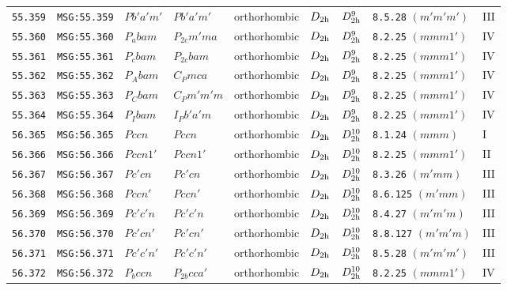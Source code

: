 \documentclass[fleqn,10pt]{jsarticle}
\begin{document}
\begin{center}
\begin{longtable}{lllllllll}
\texttt{55.359} & \texttt{MSG:55.359} & $Pb'a'm'$ & $Pb'a'm'$ & orthorhombic & $D_{\rm 2h}$ & $D_{\rm 2h}^{9}$ & \texttt{8.5.28} $(m'm'm')$ & III \\
\texttt{55.360} & \texttt{MSG:55.360} & $P_{a}bam$ & $P_{2c}m'ma$ & orthorhombic & $D_{\rm 2h}$ & $D_{\rm 2h}^{9}$ & \texttt{8.2.25} $(mmm1')$ & IV \\
\texttt{55.361} & \texttt{MSG:55.361} & $P_{c}bam$ & $P_{2c}bam$ & orthorhombic & $D_{\rm 2h}$ & $D_{\rm 2h}^{9}$ & \texttt{8.2.25} $(mmm1')$ & IV \\
\texttt{55.362} & \texttt{MSG:55.362} & $P_{A}bam$ & $C_{P}mca$ & orthorhombic & $D_{\rm 2h}$ & $D_{\rm 2h}^{9}$ & \texttt{8.2.25} $(mmm1')$ & IV \\
\texttt{55.363} & \texttt{MSG:55.363} & $P_{C}bam$ & $C_{P}m'm'm$ & orthorhombic & $D_{\rm 2h}$ & $D_{\rm 2h}^{9}$ & \texttt{8.2.25} $(mmm1')$ & IV \\
\texttt{55.364} & \texttt{MSG:55.364} & $P_{I}bam$ & $I_{P}b'a'm$ & orthorhombic & $D_{\rm 2h}$ & $D_{\rm 2h}^{9}$ & \texttt{8.2.25} $(mmm1')$ & IV \\ \hline
\texttt{56.365} & \texttt{MSG:56.365} & $Pccn$ & $Pccn$ & orthorhombic & $D_{\rm 2h}$ & $D_{\rm 2h}^{10}$ & \texttt{8.1.24} $(mmm)$ & I \\
\texttt{56.366} & \texttt{MSG:56.366} & $Pccn1'$ & $Pccn1'$ & orthorhombic & $D_{\rm 2h}$ & $D_{\rm 2h}^{10}$ & \texttt{8.2.25} $(mmm1')$ & II \\
\texttt{56.367} & \texttt{MSG:56.367} & $Pc'cn$ & $Pc'cn$ & orthorhombic & $D_{\rm 2h}$ & $D_{\rm 2h}^{10}$ & \texttt{8.3.26} $(m'mm)$ & III \\
\texttt{56.368} & \texttt{MSG:56.368} & $Pccn'$ & $Pccn'$ & orthorhombic & $D_{\rm 2h}$ & $D_{\rm 2h}^{10}$ & \texttt{8.6.125} $(m'mm)$ & III \\
\texttt{56.369} & \texttt{MSG:56.369} & $Pc'c'n$ & $Pc'c'n$ & orthorhombic & $D_{\rm 2h}$ & $D_{\rm 2h}^{10}$ & \texttt{8.4.27} $(m'm'm)$ & III \\
\texttt{56.370} & \texttt{MSG:56.370} & $Pc'cn'$ & $Pc'cn'$ & orthorhombic & $D_{\rm 2h}$ & $D_{\rm 2h}^{10}$ & \texttt{8.8.127} $(m'm'm)$ & III \\
\texttt{56.371} & \texttt{MSG:56.371} & $Pc'c'n'$ & $Pc'c'n'$ & orthorhombic & $D_{\rm 2h}$ & $D_{\rm 2h}^{10}$ & \texttt{8.5.28} $(m'm'm')$ & III \\
\texttt{56.372} & \texttt{MSG:56.372} & $P_{b}ccn$ & $P_{2b}cca'$ & orthorhombic & $D_{\rm 2h}$ & $D_{\rm 2h}^{10}$ & \texttt{8.2.25} $(mmm1')$ & IV \\

\end{longtable}
\end{center}
\end{document}
